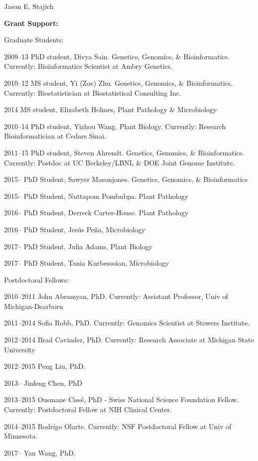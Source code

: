 \documentclass[10pt]{article}
\begin{document}
\begin{cv}{\centerline{Jason E. Stajich}}
\begin{cvlistcompact}{\bf Grant Support:}
\begin{cvlistcompact}{Graduate Students:}
\item [2009--13] PhD student, Divya Sain. Genetics, Genomics, \&
  Bioinformatics. Currently: Bioinformatics Scientist at Ambry Genetics.
\item [2010--12] MS student, Yi (Zoe) Zhu. Genetics, Genomics, \&
  Bioinformatics. Currently: Biostatistician at Biostatistical Consulting Inc.
\item [2014] MS student, Elizabeth Holmes, Plant Pathology \& Microbiology
\item [2010--14] PhD student, Yizhou Wang. Plant Biology. Currently:
  Research Bioinformatician at Cedars Sinai.
\item [2011--15] PhD student, Steven Ahrendt. Genetics, Genomics, \&
  Bioinformatics. Currently: Postdoc at UC Berkeley/LBNL \& DOE Joint
  Genome Institute.
\item [2015--] PhD Student, Sawyer Masonjones. Genetics, Genomics, \&
  Bioinformatics
\item [2015--] PhD Student, Nuttapom Pombubpa. Plant Pathology
\item [2016--] PhD Student, Derreck Carter-House. Plant Pathology
\item [2016--] PhD Student, Jes\'{u}s Pe\~{n}a, Microbiology
\item [2017--] PhD Student, Julia Adams, Plant Biology
\item [2017--] PhD Student, Tania Kurbessoian, Microbiology
\end{cvlistcompact}

\begin{cvlistcompact}{Postdoctoral Fellows:}
\item [2010--2011] John Abramyan, PhD. Currently: Assistant Professor, Univ of Michigan-Dearborn
\item [2011--2014] Sofia Robb, PhD. Currently: Genomics Scientist at
  Stowers Institute.
\item [2012--2014] Brad Cavinder, PhD. Currently: Research Associate at Michigan
  State University
\item [2012--2015] Peng Liu, PhD. 
\item [2013--] Jinfeng Chen, PhD
\item [2013--2015] Ousmane Ciss\'{e}, PhD - Swiss National Science
  Foundation Fellow. Currently: Postdoctoral Fellow at NIH Clinical Center.
\item [2014--2015] Rodrigo Olarte. Currently: NSF Postdoctoral Fellow
  at Univ of Minnesota.
\item [2017--] Yan Wang, PhD.
\end{cvlistcompact}


\end{cvlistcompact}
\end{cv}
\end{document}

